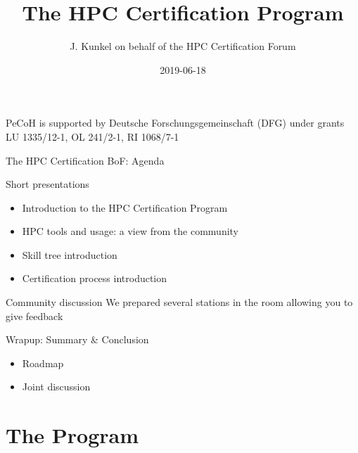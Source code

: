 \documentclass[compress,aspectratio=169]{beamer}
\subtitle{}
\title{\huge The HPC Certification Program}
\author{J. Kunkel on behalf of the HPC Certification Forum}
\date{2019-06-18}
\institute{Department of Computer Science}
\begin{document}
\begin{frame}[plain]{}
	\maketitle
	{\fontsize{5.85pt}{6pt}\selectfont PeCoH is supported by Deutsche Forschungsgemeinschaft (DFG) under grants LU 1335/12-1, OL 241/2-1, RI 1068/7-1}
\end{frame}


\begin{frame}{The HPC Certification BoF: Agenda}
	\begin{block}{Short presentations}
	\begin{itemize}
		\item Introduction to the HPC Certification Program
		\item HPC tools and usage: a view from the community
		\item Skill tree introduction
		\item Certification process introduction
	\end{itemize}
	\end{block}

	\begin{block}{Community discussion}
		We prepared several stations in the room allowing you to give feedback %
	\end{block}

	\begin{block}{Wrapup: Summary \& Conclusion}
		\begin{itemize}
			\item Roadmap
			\item Joint discussion
		\end{itemize}
	\end{block}

\end{frame}


\section{The Program}
\sectionIntroHidden

\subsection{}
\end{document}

